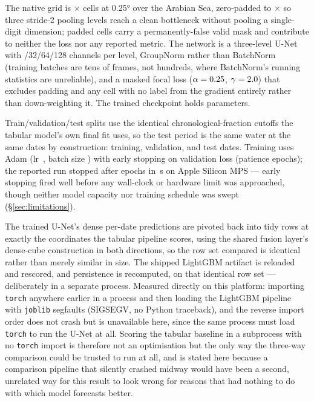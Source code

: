  The native grid is \NativeLat{}$\times$\NativeLon{}
cells at 0.25\si{\degree} over the Arabian Sea, zero-padded to
\PadLat{}$\times$\PadLon{} so three stride-2 pooling levels reach a clean
bottleneck without pooling a single-digit dimension; padded cells carry a
permanently-false valid mask and contribute to neither the loss nor any
reported metric. The network is a three-level U-Net with
\BaseChannels{}/32/64/128 channels per level, GroupNorm rather than
BatchNorm (training batches are tens of frames, not hundreds, where
BatchNorm's running statistics are unreliable), and a masked focal loss
($\alpha=0.25{}$, $\gamma=2.0{}$) that excludes padding and
any cell with no label from the gradient entirely rather than down-weighting
it. The trained checkpoint holds \NParams{} parameters.

 Train/validation/test splits use the
identical chronological-fraction cutoffs the tabular model's own final fit
uses, so the test period is the same water at the same dates by
construction: \NTrainDates{} training, \NValidationDates{} validation, and
\NTestDates{} test dates. Training uses Adam (lr~\LearningRate{}, batch size
\BatchSize{}) with early stopping on validation loss (patience
\Patience{} epochs); the reported run stopped after \EpochsRun{} epochs in
\TrainSeconds{}\,s on Apple Silicon MPS --- early stopping fired well
before any wall-clock or hardware limit was approached, though neither
model capacity nor training schedule was swept (\S\ref{sec:limitations}).

 The trained
U-Net's dense per-date predictions are pivoted back into tidy rows at
exactly the coordinates the tabular pipeline scores, using the shared
fusion layer's dense-cube construction in both directions, so the row set
compared is identical rather than merely similar in size. The shipped
LightGBM artifact is reloaded and rescored, and persistence is recomputed,
on that identical row set --- deliberately in a separate process. Measured
directly on this platform: importing \texttt{torch} anywhere earlier in a
process and then loading the LightGBM pipeline with \texttt{joblib}
segfaults (SIGSEGV, no Python traceback), and the reverse import order does
not crash but is unavailable here, since the same process must load
\texttt{torch} to run the U-Net at all. Scoring the tabular baseline in a
subprocess with no \texttt{torch} import is therefore not an optimisation
but the only way the three-way comparison could be trusted to run at all,
and is stated here because a comparison pipeline that silently crashed
midway would have been a second, unrelated way for this result to look
wrong for reasons that had nothing to do with which model forecasts better.


